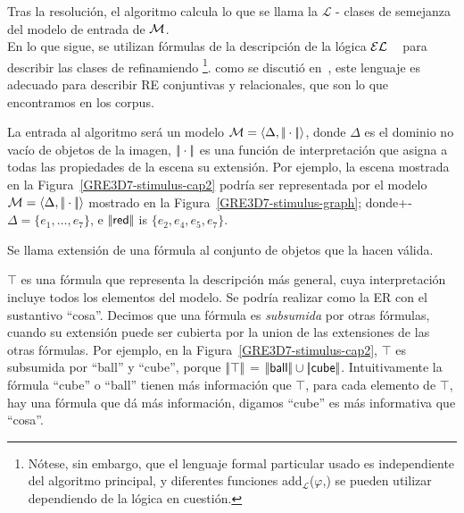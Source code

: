 

Tras la resoluci\'on, el algoritmo calcula lo que se llama la
$\mathcal{L}$ - clases de semejanza del modelo de entrada de $\mathcal{M}$.\\


En lo que sigue, se utilizan f\'ormulas de la descripci\'on de la l\'ogica $\mathcal{EL}$
~\cite{baad:desc03} para describir las clases de refinamiendo
\footnote{N\'otese, sin embargo, que el lenguaje formal particular usado es
   independiente del algoritmo principal, y diferentes funciones
  add$_{\mathcal{L}}$($\varphi$,\RE) se pueden utilizar dependiendo
   de la l\'ogica en cuesti\'on.}. como se discuti\'o 
en~\cite{arec2:2008:Areces}, 
este lenguaje es adecuado para describir
RE conjuntivas y relacionales, que son lo que encontramos en los corpus.

  La entrada al algoritmo ser\'a un modelo $\mathcal{M} =
 \langle \Delta, |\!|\cdot|\!| \rangle$, donde $\Delta$ es el dominio no vac\'io de objetos de la imagen,
 $|\!|\cdot|\!|$ es una funci\'on de interpretaci\'on que asigna a todas las propiedades de la escena su extensi\'on.
 Por ejemplo, la escena mostrada en la Figura~\ref{GRE3D7-stimulus-cap2} podr\'ia ser representada por el modelo
 $\mathcal{M}=\langle \Delta,|\!|\cdot|\!| \rangle$ mostrado en la 
 Figura~\ref{GRE3D7-stimulus-graph}; donde+- $\Delta =
 \{e_1,\ldots,e_7\}$, e $|\!|\textsf{red}|\!|$ is $\{e_2, e_4, e_5,
 e_7\}$.

Se llama extensi\'on de una f\'ormula al conjunto de objetos que la hacen v\'alida.

$\top$ es una f\'ormula que representa la descripci\'on m\'as general, cuya
interpretaci\'on incluye todos los elementos del modelo. Se podr\'ia realizar
como la ER con el sustantivo
``\textsf{cosa}''. Decimos que una f\'ormula es
\emph{subsumida} por otras f\'ormulas, cuando su extensi\'on puede ser cubierta por la
union de las extensiones de las otras f\'ormulas. Por ejemplo, en la
Figura~\ref{GRE3D7-stimulus-cap2}, $\top$ es subsumida por ``\textsf{ball}'' y
``\textsf{cube}'', porque $|\!|\top|\!|$ = $|\!|\textsf{ball}|\!|
\cup |\!|\textsf{cube}|\!|$.
Intuitivamente la f\'ormula ``\textsf{cube}'' o ``\textsf{ball}'' tienen m\'as informaci\'on que $\top$, para cada elemento de $\top$, hay una f\'ormula que d\'a m\'as informaci\'on, digamos ``\textsf{cube}'' es m\'as informativa que ``\textsf{cosa}''.\\

